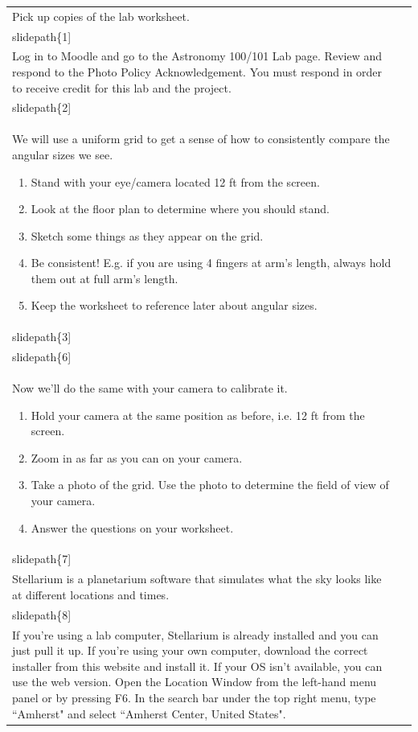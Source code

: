 \documentclass[12pt]{article}
\begin{document}
\begin{longtable}{|m{}|m{}|}\hline
Pick up copies of the lab worksheet. & \texttt{[image: \\slidepath\{1]}}\\\hline
Log in to Moodle and go to the Astronomy 100/101 Lab page. Review and respond to the Photo Policy Acknowledgement. You must respond in order to receive credit for this lab and the project.& \texttt{[image: \\slidepath\{2]}}\\\hline
We will use a uniform grid to get a sense of how to consistently compare the angular sizes we see. 

\begin{enumerate}
\item Stand with your eye/camera located 12 ft from the screen. 
\item Look at the floor plan to determine where you should stand. 
\item Sketch some things as they appear on the grid. 
\item Be consistent! E.g. if you are using 4 fingers at arm's length, always hold them out at full arm's length. 
\item Keep the worksheet to reference later about angular sizes.
\end{enumerate} & \texttt{[image: \\slidepath\{3]}}

\texttt{[image: \\slidepath\{6]}}\\\hline
Now we'll do the same with your camera to calibrate it.

\begin{enumerate}
\item Hold your camera at the same position as before, i.e. 12 ft from the screen.
\item Zoom in as far as you can on your camera.
\item Take a photo of the grid. Use the photo to determine the field of view of your camera.
\item Answer the questions on your worksheet.
\end{enumerate} & \texttt{[image: \\slidepath\{7]}}\\\hline
Stellarium is a planetarium software that simulates what the sky looks like at different locations and times. & \texttt{[image: \\slidepath\{8]}}\\\hline
If you're using a lab computer, Stellarium is already installed and you can just pull it up. If you're using your own computer, download the correct installer from this website and install it. If your OS isn't available, you can use the web version. Open the Location Window from the left-hand menu panel or by pressing F6. In the search bar under the top right menu, type ``Amherst" and select ``Amherst Center, United States".


\end{longtable}
\end{document}
